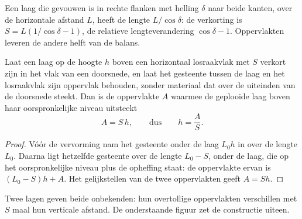 Een laag die gevouwen is in rechte flanken met helling $\delta$ naar beide kanten, over de
horizontale afstand $L$, heeft de lengte $L/\cos\delta$: de verkorting is
$S = L(1/\cos\delta - 1)$, de relatieve lengteverandering $\cos\delta - 1$.
Oppervlakten leveren de andere helft van de balans.

\begin{proposition}\label{prop:b3:structural-analysis:detachment}
Laat een laag op de hoogte $h$ boven een horizontaal losraakvlak met $S$ verkort zijn
in het vlak van een doorsnede, en laat het gesteente tussen de laag en het losraakvlak
zijn oppervlak behouden, zonder materiaal dat over de uiteinden van de doorsnede steekt. Dan is de
oppervlakte $A$ waarmee de geplooide laag boven haar oorspronkelijke niveau uitsteekt
\[
  A = S\,h , \qquad\text{dus}\qquad h = \frac AS .
\]
\end{proposition}

\begin{proof}
Vóór de vervorming nam het gesteente onder de laag $L_0 h$ in over de
lengte $L_0$. Daarna ligt hetzelfde gesteente over de lengte $L_0 - S$, onder
de laag, die op het oorspronkelijke niveau plus de opheffing staat: de oppervlakte ervan is
$(L_0 - S)h + A$. Het gelijkstellen van de twee oppervlakten geeft $A = Sh$.
\end{proof}

Twee lagen geven beide onbekenden: hun overtollige oppervlakten verschillen met $S$ maal
hun verticale afstand. De onderstaande figuur zet de constructie uiteen.

